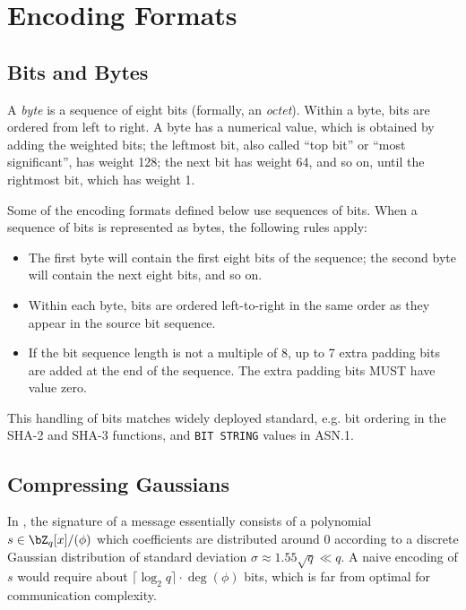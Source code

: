 

\section{Encoding Formats} \label{sec:spec:encode}

\subsection{Bits and Bytes}

A \emph{byte} is a sequence of eight bits (formally, an \emph{octet}).
Within a byte, bits are ordered from left to right. A byte has a
numerical value, which is obtained by adding the weighted bits; the
leftmost bit, also called ``top bit'' or ``most significant'', has
weight 128; the next bit has weight 64, and so on, until the rightmost
bit, which has weight 1.

Some of the encoding formats defined below use sequences of bits. When
a sequence of bits is represented as bytes, the following rules apply:
\begin{itemize}
\item The first byte will contain the first eight bits of the sequence;
the second byte will contain the next eight bits, and so on.
\item Within each byte, bits are ordered left-to-right in the same order
as they appear in the source bit sequence.
\item If the bit sequence length is not a multiple of 8, up to 7 extra
padding bits are added at the end of the sequence. The extra padding bits
MUST have value zero.
\end{itemize}

This handling of bits matches widely deployed standard, e.g. bit
ordering in the SHA-2 and SHA-3 functions, and \texttt{BIT STRING}
values in ASN.1.

\subsection{Compressing Gaussians} \label{sec:spec:encode:compress}


In \falcon, the signature of a message essentially consists of a polynomial $s \in \bZ_q[x]/(\phi)$ which coefficients are distributed around $0$ according to a discrete Gaussian distribution of standard deviation $\sigma \approx 1.55 \sqrt{q} \ll q$. A naive encoding of $s$ would require about $\lceil \log_2 q\rceil \cdot \deg(\phi)$ bits, which is far from optimal for communication complexity.

